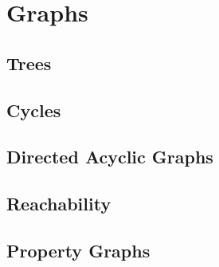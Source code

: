 \section{Graphs}



\subsection{Trees}

\subsection{Cycles}

\subsection{Directed Acyclic Graphs}

\subsection{Reachability}

\subsection{Property Graphs}

